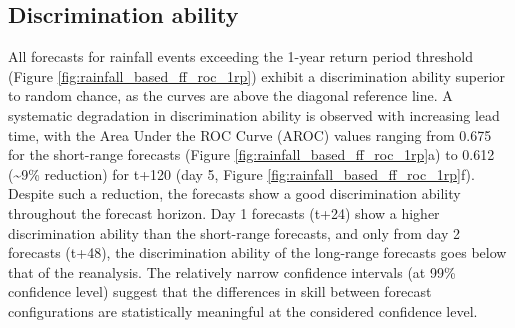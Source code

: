 \subsection{Discrimination ability}

All forecasts for rainfall events exceeding the 1-year return period threshold (Figure \ref{fig:rainfall_based_ff_roc_1rp}) exhibit a discrimination ability superior to random chance, as the curves are above the diagonal reference line. A systematic degradation in discrimination ability is observed with increasing lead time, with the Area Under the ROC Curve (AROC) values ranging from 0.675 for the short-range forecasts (Figure \ref{fig:rainfall_based_ff_roc_1rp}a) to 0.612 (\sim9\% reduction) for t+120 (day 5, Figure \ref{fig:rainfall_based_ff_roc_1rp}f). Despite such a reduction, the forecasts show a good discrimination ability throughout the forecast horizon. Day 1 forecasts (t+24) show a higher discrimination ability than the short-range forecasts, and only from day 2 forecasts (t+48), the discrimination ability of the long-range forecasts goes below that of the reanalysis. The relatively narrow confidence intervals (at 99\% confidence level) suggest that the differences in skill between forecast configurations are statistically meaningful at the considered confidence level.

